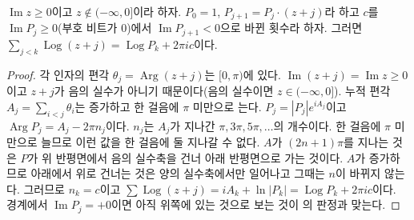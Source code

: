 \begin{lemma}
\label{lem:crossings}
$\operatorname{Im}z\ge0$이고 $z\notin(-\infty,0]$이라 하자. $P_0=1$, $P_{j+1}=P_j\cdot(z+j)$라 하고 $c$를 $\operatorname{Im}P_j\ge0$(부호 비트가 $0$)에서 $\operatorname{Im}P_{j+1}<0$으로 바뀐 횟수라 하자. 그러면 $\sum_{j<k}\operatorname{Log}(z+j)=\operatorname{Log}P_k+2\pi ic$이다.
\end{lemma}

\begin{proof}
각 인자의 편각 $\theta_j=\operatorname{Arg}(z+j)$는 $[0,\pi)$에 있다. $\operatorname{Im}(z+j)=\operatorname{Im}z\ge0$이고 $z+j$가 음의 실수가 아니기 때문이다(음의 실수이면 $z\in(-\infty,0]$). 누적 편각 $A_j=\sum_{i<j}\theta_i$는 증가하고 한 걸음에 $\pi$ 미만으로 는다. $P_j=|P_j|e^{iA_j}$이고 $\operatorname{Arg}P_j=A_j-2\pi n_j$이다. $n_j$는 $A_j$가 지나간 $\pi,3\pi,5\pi,\dots$의 개수이다. 한 걸음에 $\pi$ 미만으로 늘므로 이런 값을 한 걸음에 둘 지나갈 수 없다. $A$가 $(2n+1)\pi$를 지나는 것은 $P$가 위 반평면에서 음의 실수축을 건너 아래 반평면으로 가는 것이다. $A$가 증가하므로 아래에서 위로 건너는 것은 양의 실수축에서만 일어나고 그때는 $n$이 바뀌지 않는다. 그러므로 $n_k=c$이고 $\sum\operatorname{Log}(z+j)=i A_k+\ln|P_k|=\operatorname{Log}P_k+2\pi ic$이다. 경계에서 $\operatorname{Im}P_j=+0$이면 아직 위쪽에 있는 것으로 보는 것이 의 판정과 맞는다.
\end{proof}

